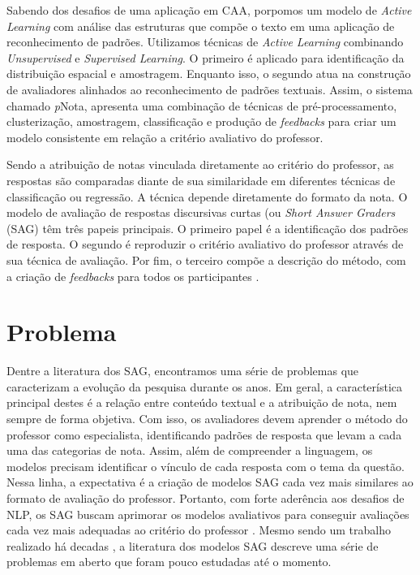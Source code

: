 Sabendo dos desafios de uma aplicação em CAA, porpomos um modelo de \textit{Active Learning} com análise das estruturas que compõe o texto em uma aplicação de reconhecimento de padrões. Utilizamos técnicas de \textit{Active Learning} combinando \textit{Unsupervised} e \textit{ Supervised Learning}. O primeiro é aplicado para identificação da distribuição espacial e amostragem. Enquanto isso, o segundo atua na construção de avaliadores alinhados ao reconhecimento de padrões textuais. Assim, o sistema chamado \textit{p}Nota, apresenta uma combinação de técnicas de pré-processamento, clusterização, amostragem, classificação e produção de \textit{feedbacks} para criar um modelo consistente em relação a critério avaliativo do professor.

Sendo a atribuição de notas vinculada diretamente ao critério do professor, as respostas são comparadas diante de sua similaridade em diferentes técnicas de classificação ou regressão. A técnica depende diretamente do formato da nota. O modelo de avaliação de respostas discursivas curtas (ou \textit{Short Answer Graders} (SAG) têm três papeis principais. O primeiro papel é a identificação dos padrões de resposta. O segundo é reproduzir o critério avaliativo do professor através de sua técnica de avaliação. Por fim, o terceiro compõe a descrição do método, com a criação de \textit{feedbacks} para todos os participantes \cite{arter2006, spalenza2016a}.


\section{Problema} 
\label{cap1-problema}

Dentre a literatura dos SAG, encontramos uma série de problemas que caracterizam a evolução da pesquisa durante os anos. Em geral, a característica principal destes é a relação entre conteúdo textual e a atribuição de nota, nem sempre de forma objetiva. Com isso, os avaliadores devem aprender o método do professor como especialista, identificando padrões de resposta que levam a cada uma das categorias de nota. Assim, além de compreender a linguagem, os modelos precisam identificar o vínculo de cada resposta com o tema da questão. Nessa linha, a expectativa é a criação de modelos SAG cada vez mais similares ao formato de avaliação do professor. Portanto, com forte aderência aos desafios de NLP, os SAG buscam aprimorar os modelos avaliativos para conseguir avaliações cada vez mais adequadas ao critério do professor \cite{pado2021}. Mesmo sendo um trabalho realizado há decadas \cite{burrows2015}, a literatura dos modelos SAG descreve uma série de problemas em aberto que foram pouco estudadas até o momento.

